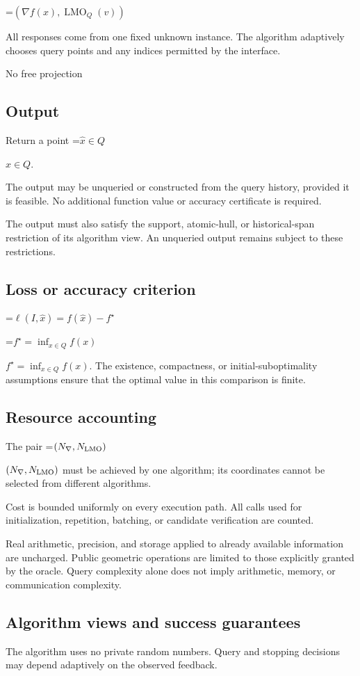 \documentclass[10pt,a4paper]{article}
\newcommand{\AtlasMath}[1]{\par\begingroup\centering\setbox0=\hbox{$\displaystyle #1$}\ifdim\wd0>1.4\linewidth\typeout{ATLAS WIDE FORMULA: \the\wd0}\fi\ifdim\wd0>\linewidth\resizebox{\linewidth}{!}{\box0}\else\box0\fi\par\endgroup}
\newcommand{\AtlasInlineMath}[1]{\begingroup\setbox0=\hbox{$#1$}\ifdim\wd0>.4\linewidth\endgroup\AtlasMath{#1}\else\endgroup$#1$\fi}
\begin{document}
\AtlasMath{(\nabla f(x),\operatorname{LMO}_Q(v))}


All responses come from one fixed unknown instance. The algorithm adaptively chooses query points and any indices permitted by the interface.

No free projection

\subsection{Output}
Return a point \AtlasInlineMath{\widehat x\in Q}.

The output may be unqueried or constructed from the query history, provided it is feasible. No additional function value or accuracy certificate is required.

The output must also satisfy the support, atomic-hull, or historical-span restriction of its algorithm view. An unqueried output remains subject to these restrictions.

\subsection{Loss or accuracy criterion}

\AtlasMath{\ell(I,\widehat{x})=f(\widehat{x})-f^\star}


\AtlasInlineMath{f^\star=\inf_{x\in Q}f(x)}. The existence, compactness, or initial-suboptimality assumptions ensure that the optimal value in this comparison is finite.

\subsection{Resource accounting}
The pair \AtlasInlineMath{(N_{\nabla},N_{\rm LMO})} must be achieved by one algorithm; its coordinates cannot be selected from different algorithms.

Cost is bounded uniformly on every execution path. All calls used for initialization, repetition, batching, or candidate verification are counted.

Real arithmetic, precision, and storage applied to already available information are uncharged. Public geometric operations are limited to those explicitly granted by the oracle. Query complexity alone does not imply arithmetic, memory, or communication complexity.

\subsection{Algorithm views and success guarantees}
The algorithm uses no private random numbers. Query and stopping decisions may depend adaptively on the observed feedback.
\end{document}
